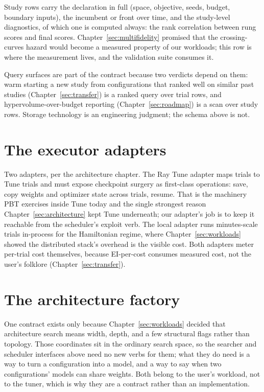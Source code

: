 Study rows carry the declaration in full (space, objective, seeds,
budget, boundary inputs), the incumbent or front over time, and the
study-level diagnostics, of which one is computed always: the rank
correlation between rung scores and final scores.
Chapter~\ref{sec:multifidelity} promised that the crossing-curves
hazard would become a measured property of our workloads; this row
is where the measurement lives, and the validation suite consumes
it.

Query surfaces are part of the contract because two verdicts depend
on them: warm starting a new study from configurations that ranked
well on similar past studies (Chapter~\ref{sec:transfer}) is a
ranked query over trial rows, and hypervolume-over-budget reporting
(Chapter~\ref{sec:roadmap}) is a scan over study rows. Storage
technology is an engineering judgment; the schema above is not.

\section{The executor adapters}

Two adapters, per the architecture chapter. The Ray Tune adapter
maps trials to Tune trials and must expose checkpoint surgery as
first-class operations: save, copy weights and optimizer state
across trials, resume. That is the machinery PBT exercises inside
Tune today and the single strongest reason
Chapter~\ref{sec:architecture} kept Tune underneath; our adapter's
job is to keep it reachable from the scheduler's exploit verb. The
local adapter runs minutes-scale trials in-process for the
Hamiltonian regime, where Chapter~\ref{sec:workloads} showed the
distributed stack's overhead is the visible cost. Both adapters
meter per-trial cost themselves, because EI-per-cost consumes
measured cost, not the user's folklore (Chapter~\ref{sec:transfer}).

\section{The architecture factory}
\label{sec:archfactory}

One contract exists only because Chapter~\ref{sec:workloads} decided
that architecture search means width, depth, and a few structural
flags rather than topology. Those coordinates sit in the ordinary
search space, so the searcher and scheduler interfaces above need no
new verbs for them; what they do need is a way to turn a
configuration into a model, and a way to say when two configurations'
models can share weights. Both belong to the user's workload, not to
the tuner, which is why they are a contract rather than an
implementation.

